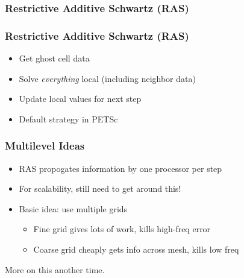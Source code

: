 \documentclass{beamer}
\begin{document}
\begin{frame}
  \frametitle{Restrictive Additive Schwartz (RAS)}

  \begin{center}
  \end{center}
\end{frame}


\begin{frame}
  \frametitle{Restrictive Additive Schwartz (RAS)}

  \begin{center}
  \end{center}

  \begin{itemize}
  \item Get {\color{green} ghost cell data}
  \item Solve {\em everything} local (including neighbor data)
  \item Update {\color{blue} local values} for next step
  \item Default strategy in PETSc
  \end{itemize}
\end{frame}


\begin{frame}
  \frametitle{Multilevel Ideas}

  \begin{itemize}
  \item RAS propogates information by one processor per step
  \item For scalability, still need to get around this!
  \item Basic idea: use multiple grids
    \begin{itemize}
    \item Fine grid gives lots of work, kills high-freq error
    \item Coarse grid cheaply gets info across mesh, kills low freq
    \end{itemize}
  \end{itemize}
  More on this another time.
\end{frame}
\end{document}
